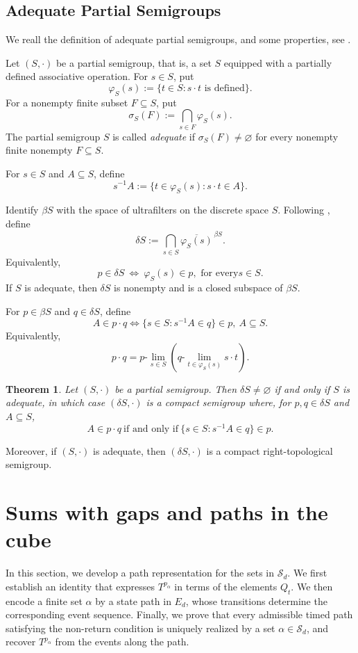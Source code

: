 \documentclass[11pt]{amsart}
\newtheorem{theorem}{Theorem}[section]
\theoremstyle{definition}
\theoremstyle{remark}
\newcommand{\Sd}{\mathcal S_d}
\begin{document}
\subsection{Adequate Partial Semigroups}
\label{sec:adequate-partial-semigroups}
We reall the definition of adequate partial semigroups, and some properties, see \cite{HindmanStrauss2012}.

Let $(S,\cdot)$ be a partial semigroup, that is, a set $S$
equipped with a partially defined associative operation. For
$s\in S$, put
\[
\varphi_S(s):=\{t\in S:s\cdot t\text{ is defined}\}.
\]
For a nonempty finite subset $F\subseteq S$, put
\[
\sigma_S(F):=\bigcap_{s\in F}\varphi_S(s).
\]
The partial semigroup $S$ is called \emph{adequate} if $\sigma_S(F)\neq\varnothing$ for every nonempty finite nonempty $F\subseteq S$.

For $s\in S$ and $A\subseteq S$, define
\[
s^{-1}A:=\{t\in\varphi_S(s):s\cdot t\in A\}.
\]
 

Identify $\beta S$ with the space of ultrafilters on the discrete
space $S$. Following \cite[Definition 4.22.1]{HindmanStrauss2012},
define
\[
\delta S:=\bigcap_{s\in S}
\overline{\varphi_S(s)}^{\,\beta S}.
\]
Equivalently,
\[
p\in\delta S\ \Longleftrightarrow\ \varphi_S(s)\in p, \text{ for every}s\in S.
\]
If $S$ is adequate, then $\delta S$ is nonempty and is a closed
subspace of $\beta S$.

For $p\in\beta S$ and $q\in\delta S$, define
\[
A\in p\cdot q \Longleftrightarrow 
\{s\in S:s^{-1}A\in q\}\in p, \ A\subseteq S.
\]
Equivalently,
\[
p\cdot q=p\text{-}\lim_{s\in S}
\left(q\text{-}\lim_{t\in\varphi_S(s)}s\cdot t\right).
\] 

\begin{theorem}\cite[Theorem 4.22.2]{HindmanStrauss2012}
  Let $(S, \cdot)$ be a partial semigroup. Then $\delta S \neq \varnothing$ if and only if $S$ is adequate, in which case $(\delta S, \cdot)$ is a compact semigroup where, for $p, q \in \delta S$ and $A \subseteq S$,
  \[
    A \in p \cdot q \  \text{if and only if} \  \{ s \in S : s^{-1}A \in q \} \in p.
  \]
\end{theorem}
 Moreover, if $(S,\cdot)$ is adequate, then $(\delta S,\cdot)$
is a compact right-topological semigroup.

 
 

\section{Sums with gaps and paths in the cube}\label{sec:cube}
In this section, we develop a path representation for the sets in $\Sd$. We first establish an identity that expresses $T^{p_\alpha}$ in terms of the elements $Q_t$. We then encode a finite set $\alpha$ by a state path in $E_d$, whose transitions determine the corresponding event sequence. Finally, we prove that every admissible timed path satisfying the non-return condition is uniquely realized by a set $\alpha\in\Sd$, and recover $T^{p_\alpha}$ from the events along the path.
\end{document}
